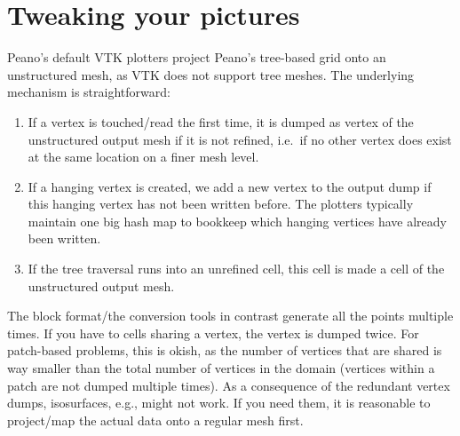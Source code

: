   
  
  
  

    
\section{Tweaking your pictures}
\label{section:postprocessing:tweaking-pictures}


Peano's default VTK plotters project Peano's tree-based grid onto an
unstructured mesh, as VTK does not support tree meshes.
The underlying mechanism is straightforward:

\begin{enumerate}
  \item If a vertex is touched/read the first time, it is dumped as vertex of
  the unstructured output mesh if it is not refined, i.e.~if no other vertex
  does exist at the same location on a finer mesh level.
  \item If a hanging vertex is created, we add a new vertex to the output dump
  if this hanging vertex has not been written before. The plotters typically
  maintain one big hash map to bookkeep which hanging vertices have already been
  written.
  \item If the tree traversal runs into an unrefined cell, this cell is made a
  cell of the unstructured output mesh.
\end{enumerate}


The block format/the conversion tools in contrast generate all the points
multiple times.
If you have to cells sharing a vertex, the vertex is dumped twice.
For patch-based problems, this is okish, as the number of vertices that are
shared is way smaller than the total number of vertices in the domain (vertices
within a patch are not dumped multiple times).
As a consequence of the redundant vertex dumps, isosurfaces, e.g., might not
work.
If you need them, it is reasonable to project/map the actual data onto a regular
mesh first.


